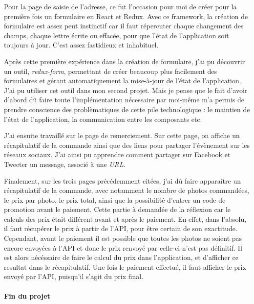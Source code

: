 \documentclass[12pt,a4paper]{article}
\begin{document}
  \bigskip

  Pour la page de saisie de l'adresse, ce fut l'occasion pour moi de créer
  pour la première fois un formulaire en React et Redux. Avec ce
  framework, la création de formulaire est assez peut instinctif car il
  faut répercuter chaque changement des champs, chaque lettre écrite ou
  effacée, pour que l'état de l'application soit toujours à jour. C'est
  assez fastidieux et inhabituel.

  \bigskip

  Après cette première expérience dans la création de formulaire, j'ai pu
  découvrir un outil, \emph{redux-form}, permettant de créer beaucoup plus
  facilement des formulaires et gérant automatiquement la mise-à-jour de
  l'état de l'application. J'ai pu utiliser cet outil dans mon second
  projet. Mais je pense que le fait d'avoir d'abord dû faire toute
  l'implémentation nécessaire par moi-même m'a permis de prendre
  conscience des problèmatiques de cette pile technologique : le maintien
  de l'état de l'application, la communication entre les composants etc.

  \bigskip

  J'ai ensuite travaillé sur le page de remerciement. Sur cette page, on
  affiche un récapitulatif de la commande ainsi que des liens pour
  partager l'évènement sur les réseaux sociaux. J'ai ainsi pu apprendre
  comment partager sur Facebook et Tweeter un message, associé à une
  \emph{URL}.

  \bigskip

  Finalement, sur les trois pages précédemment citées, j'ai dû faire
  apparaître un récapitulatif de la commande, avec notamment le nombre de
  photos commandées, le prix par photo, le prix total, ainsi que la
  possibilité d'entrer un code de promotion avant le paiement. Cette
  partie à demandée de la réflexion car le calculs des prix était
  différent avant et après le paiement. En effet, dans l'absolu, il faut
  récupérer le prix à partir de l'API, pour être certain de son
  exactitude. Cependant, avant le paiement il est possible que toutes les
  photos ne soient pas encore envoyées à l'API et donc le prix renvoyé par
  celle-ci n'est pas définitif. Il est alors nécéssaire de faire le calcul
  du prix dans l'application, et d'afficher ce resultat dans le
  récapitulatif. Une fois le paiement effectué, il faut afficher le prix
  envoyé par l'API, puisqu'il s'agit du prix final.

  \bigskip

  \paragraph{Fin du projet}\label{fin-du-projet}
\end{document}
